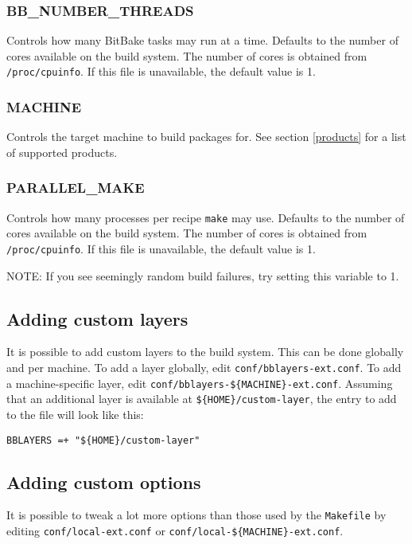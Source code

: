 \documentclass[a4paper]{article}
\newcommand{\shell}[1]{\texttt{\small #1}}
\begin{document}
    \subsubsection{BB\_NUMBER\_THREADS}
      Controls how many BitBake tasks may run at a time. Defaults to the
      number of cores available on the build system. The number of cores is
      obtained from \shell{/proc/cpuinfo}. If this file is unavailable, the
      default value is 1.

    \subsubsection{MACHINE}
      Controls the target machine to build packages for. See section \ref{products}
      for a list of supported products.

    \subsubsection{PARALLEL\_MAKE}
      Controls how many processes per recipe \shell{make} may use. Defaults to
      the number of cores available on the build system. The number of cores is
      obtained from \shell{/proc/cpuinfo}. If this file is unavailable, the
      default value is 1.

      NOTE: If you see seemingly random build failures, try setting this variable to 1.

  \subsection{Adding custom layers}
  \label{custom_layers}
     It is possible to add custom layers to the build system. This can be done globally
     and per machine. To add a layer globally, edit \shell{conf/bblayers-ext.conf}. To
     add a machine-specific layer, edit \shell{conf/bblayers-\$\{MACHINE\}-ext.conf}.
     Assuming that an additional layer is available at \shell{\$\{HOME\}/custom-layer},
     the entry to add to the file will look like this:

     \shell{BBLAYERS =+ "\$\{HOME\}/custom-layer"}

  \subsection{Adding custom options}
     It is possible to tweak a lot more options than those used by the
     \shell{Makefile} by editing \shell{conf/local-ext.conf} or \shell{conf/local-\$\{MACHINE\}-ext.conf}.
\end{document}
